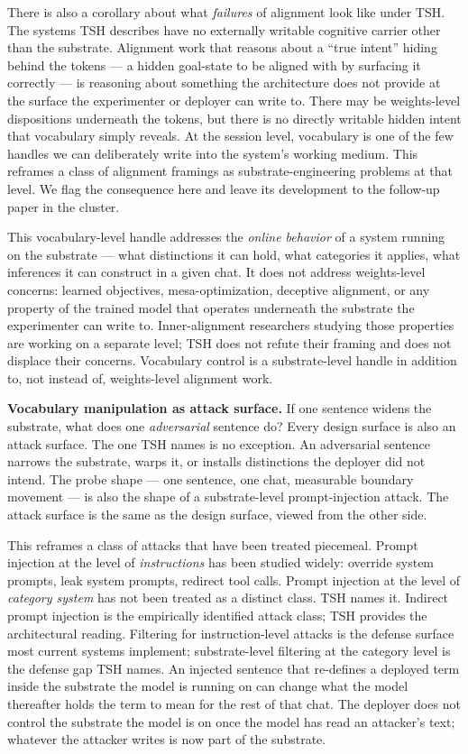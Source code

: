 \documentclass[11pt,a4paper]{article}
\begin{document}
There is also a corollary about what \textit{failures} of alignment look like under TSH. The systems TSH describes have no externally writable cognitive carrier other than the substrate. Alignment work that reasons about a ``true intent'' hiding behind the tokens --- a hidden goal-state to be aligned with by surfacing it correctly --- is reasoning about something the architecture does not provide at the surface the experimenter or deployer can write to. There may be weights-level dispositions underneath the tokens, but there is no directly writable hidden intent that vocabulary simply reveals. At the session level, vocabulary is one of the few handles we can deliberately write into the system's working medium. This reframes a class of alignment framings as substrate-engineering problems at that level. We flag the consequence here and leave its development to the follow-up paper in the cluster.

This vocabulary-level handle addresses the \textit{online behavior} of a system running on the substrate --- what distinctions it can hold, what categories it applies, what inferences it can construct in a given chat. It does not address weights-level concerns: learned objectives, mesa-optimization, deceptive alignment, or any property of the trained model that operates underneath the substrate the experimenter can write to. Inner-alignment researchers studying those properties are working on a separate level; TSH does not refute their framing and does not displace their concerns. Vocabulary control is a substrate-level handle in addition to, not instead of, weights-level alignment work.

\textbf{Vocabulary manipulation as attack surface.} If one sentence widens the substrate, what does one \textit{adversarial} sentence do? Every design surface is also an attack surface. The one TSH names is no exception. An adversarial sentence narrows the substrate, warps it, or installs distinctions the deployer did not intend. The probe shape --- one sentence, one chat, measurable boundary movement --- is also the shape of a substrate-level prompt-injection attack. The attack surface is the same as the design surface, viewed from the other side.

This reframes a class of attacks that have been treated piecemeal. Prompt injection at the level of \textit{instructions} has been studied widely: override system prompts, leak system prompts, redirect tool calls. Prompt injection at the level of \textit{category system} has not been treated as a distinct class. TSH names it. Indirect prompt injection \citep{greshake2023signed} is the empirically identified attack class; TSH provides the architectural reading. Filtering for instruction-level attacks is the defense surface most current systems implement; substrate-level filtering at the category level is the defense gap TSH names. An injected sentence that re-defines a deployed term inside the substrate the model is running on can change what the model thereafter holds the term to mean for the rest of that chat. The deployer does not control the substrate the model is on once the model has read an attacker's text; whatever the attacker writes is now part of the substrate.
\end{document}
